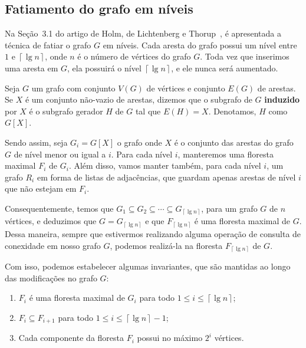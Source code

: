 \subsection{Fatiamento do grafo em níveis}
\label{sec:level-slicing}

Na Seção~3.1 do artigo de Holm, de Lichtenberg e Thorup~\cite{jacob_holm}, é apresentada a técnica de fatiar o grafo $G$ em níveis. Cada aresta do grafo possui um nível entre $1$ e $\left\lceil \lg n \right\rceil$, onde $n$ é o número de vértices do grafo $G$. Toda vez que inserimos uma aresta em $G$, ela possuirá o nível $\left\lceil \lg n \right\rceil$, e ele nunca será aumentado. 

Seja $G$ um grafo com conjunto $V(G)$ de vértices e conjunto $E(G)$ de arestas. Se $X$ é um conjunto não-vazio de arestas, dizemos que o subgrafo de $G$ \textbf{induzido} por $X$ é o subgrafo gerador $H$ de $G$ tal que $E(H) = X$. Denotamos, $H$ como $G[X]$.

Sendo assim, seja $G_i = G[X]$ o grafo onde $X$ é o conjunto das arestas do grafo $G$ de nível menor ou igual a $i$. Para cada nível $i$, manteremos uma floresta maximal $F_i$ de $G_i$. Além disso, vamos manter também, para cada nível $i$, um grafo $R_i$ em forma de listas de adjacências, que guardam apenas arestas de nível $i$ que não estejam em $F_i$. 

Consequentemente, temos que $G_1 \subseteq G_2 \subseteq \cdots \subseteq G_{\left\lceil \lg n \right\rceil}$, para um grafo $G$ de $n$ vértices, e deduzimos que $G = G_{\left\lceil \lg n \right\rceil}$ e que $F_{\left\lceil \lg n \right\rceil}$ é uma floresta maximal de $G$. Dessa maneira, sempre que estivermos realizando alguma operação de consulta de conexidade em nosso grafo $G$, podemos realizá-la na floresta $F_{\left\lceil \lg n \right\rceil}$ de $G$.

Com isso, podemos estabelecer algumas invariantes, que são mantidas ao longo das modificações no grafo $G$:

\begin{enumerate}[label=(\Roman*)]
    \item \label{invariant1} $F_i$ é uma floresta maximal de $G_i$ para todo $1 \leq i \leq  \left\lceil \lg n \right\rceil$;
    
    \item \label{invariant2} $F_i \subseteq F_{i+1}$ para todo $1 \leq i \leq \left\lceil \lg n \right\rceil - 1$;
    
    \item \label{invariant3} Cada componente da floresta $F_i$ possui no máximo $2^i$ vértices.
\end{enumerate}

